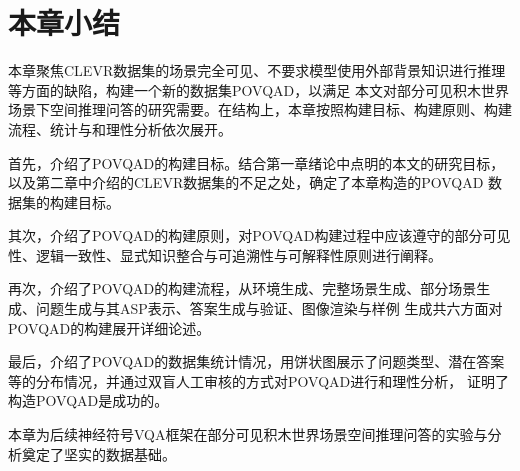 \section{本章小结}
本章聚焦CLEVR数据集的场景完全可见、不要求模型使用外部背景知识进行推理等方面的缺陷，构建一个新的数据集POVQAD，以满足
本文对部分可见积木世界场景下空间推理问答的研究需要。在结构上，本章按照构建目标、构建原则、构建流程、统计与和理性分析依次展开。

首先，介绍了POVQAD的构建目标。结合第一章绪论中点明的本文的研究目标，以及第二章中介绍的CLEVR数据集的不足之处，确定了本章构造的POVQAD
数据集的构建目标。

其次，介绍了POVQAD的构建原则，对POVQAD构建过程中应该遵守的部分可见性、逻辑一致性、显式知识整合与可追溯性与可解释性原则进行阐释。

再次，介绍了POVQAD的构建流程，从环境生成、完整场景生成、部分场景生成、问题生成与其ASP表示、答案生成与验证、图像渲染与样例
生成共六方面对POVQAD的构建展开详细论述。

最后，介绍了POVQAD的数据集统计情况，用饼状图展示了问题类型、潜在答案等的分布情况，并通过双盲人工审核的方式对POVQAD进行和理性分析，
证明了构造POVQAD是成功的。

本章为后续神经符号VQA框架在部分可见积木世界场景空间推理问答的实验与分析奠定了坚实的数据基础。
